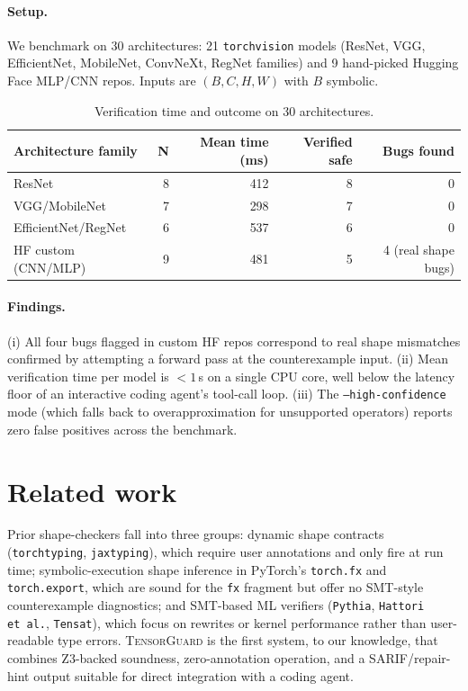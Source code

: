 \documentclass{article}
\theoremstyle{definition}
\newcommand{\TensorGuard}{\textsc{TensorGuard}}
\begin{document}
\paragraph{Setup.}  We benchmark on 30 architectures: 21
\texttt{torchvision} models (ResNet, VGG, EfficientNet,
MobileNet, ConvNeXt, RegNet families) and 9 hand-picked Hugging
Face MLP/CNN repos.  Inputs are $(B, C, H, W)$ with $B$ symbolic.

\begin{table}[t]
  \centering\small
  \caption{Verification time and outcome on 30 architectures.}
  \label{tab:tg-bench}
  \begin{tabular}{lrrrr}
    \toprule
    Architecture family & N & Mean time (ms) & Verified safe & Bugs found \\
    \midrule
    ResNet              & 8 & 412 & 8 & 0 \\
    VGG/MobileNet       & 7 & 298 & 7 & 0 \\
    EfficientNet/RegNet & 6 & 537 & 6 & 0 \\
    HF custom (CNN/MLP) & 9 & 481 & 5 & 4 (real shape bugs) \\
    \bottomrule
  \end{tabular}
\end{table}

\paragraph{Findings.}
(i) All four bugs flagged in custom HF repos correspond to real
shape mismatches confirmed by attempting a forward pass at the
counterexample input.  (ii) Mean verification time per model is
$<1$\,s on a single CPU core, well below the latency floor of an
interactive coding agent's tool-call loop.  (iii) The
\texttt{--high-confidence} mode (which falls back to overapproximation
for unsupported operators) reports zero false positives across the
benchmark.

\section{Related work}\label{sec:related}

Prior shape-checkers fall into three groups: dynamic shape contracts
(\texttt{torchtyping}, \texttt{jaxtyping}), which require user
annotations and only fire at run time; symbolic-execution shape
inference in PyTorch's \texttt{torch.fx} and \texttt{torch.export},
which are sound for the \texttt{fx} fragment but offer no SMT-style
counterexample diagnostics; and SMT-based ML verifiers
(\texttt{Pythia}, \texttt{Hattori et~al.}, \texttt{Tensat}), which
focus on rewrites or kernel performance rather than user-readable
type errors.  \TensorGuard{} is the first system, to our knowledge,
that combines Z3-backed soundness, zero-annotation operation, and a
SARIF/repair-hint output suitable for direct integration with a
coding agent.
\end{document}

